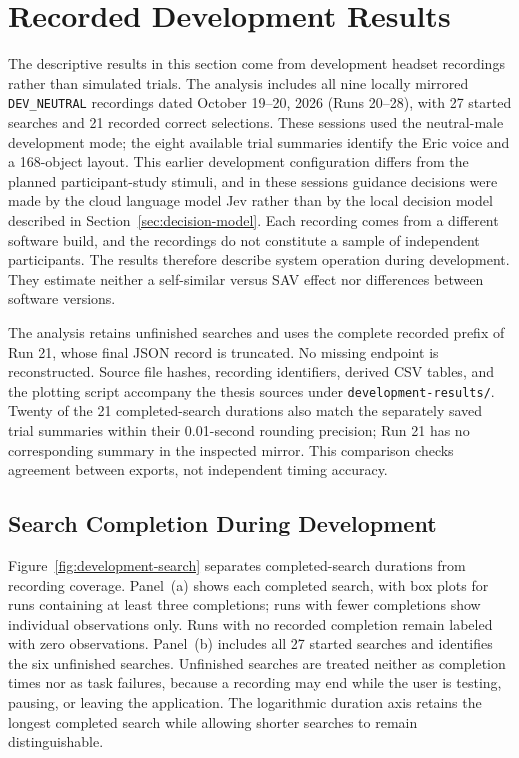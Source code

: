 \section{Recorded Development Results}
\label{sec:development-results}
The descriptive results in this section come from development headset recordings rather than simulated trials. The analysis includes all nine locally mirrored \texttt{DEV\_NEUTRAL} recordings dated October 19--20, 2026 (Runs 20--28), with 27 started searches and 21 recorded correct selections. These sessions used the neutral-male development mode; the eight available trial summaries identify the Eric voice and a 168-object layout. This earlier development configuration differs from the planned participant-study stimuli, and in these sessions guidance decisions were made by the cloud language model Jev rather than by the local decision model described in Section~\ref{sec:decision-model}. Each recording comes from a different software build, and the recordings do not constitute a sample of independent participants. The results therefore describe system operation during development. They estimate neither a self-similar versus SAV effect nor differences between software versions.

The analysis retains unfinished searches and uses the complete recorded prefix of Run 21, whose final JSON record is truncated. No missing endpoint is reconstructed. Source file hashes, recording identifiers, derived CSV tables, and the plotting script accompany the thesis sources under \texttt{development-results/}. Twenty of the 21 completed-search durations also match the separately saved trial summaries within their 0.01-second rounding precision; Run 21 has no corresponding summary in the inspected mirror. This comparison checks agreement between exports, not independent timing accuracy.

\subsection{Search Completion During Development}
Figure~\ref{fig:development-search} separates completed-search durations from recording coverage. Panel~(a) shows each completed search, with box plots for runs containing at least three completions; runs with fewer completions show individual observations only. Runs with no recorded completion remain labeled with zero observations. Panel~(b) includes all 27 started searches and identifies the six unfinished searches. Unfinished searches are treated neither as completion times nor as task failures, because a recording may end while the user is testing, pausing, or leaving the application. The logarithmic duration axis retains the longest completed search while allowing shorter searches to remain distinguishable.

